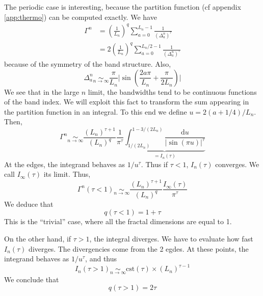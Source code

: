 \documentclass[11pt]{article}
\numberwithin{equation}{section}
\renewcommand{\d}[1]{\mathrm{d}#1}
\newcommand{\simlim}[2]{\ensuremath{ \underset{#1 \rightarrow #2}{\sim} }}
\begin{document}
The periodic case is interesting, because the partition function (cf appendix \ref{app:thermo}) can be computed exactly.
We have
\begin{align}
	\Gamma^n &= \left(\frac{1}{L_n}\right)^q\sum_{a=0}^{L_n -1} \frac{1}{(\Delta_a^n)^\tau} \\
	&= 2\left(\frac{1}{L_n}\right)^q\sum_{a=0}^{L_n/2 -1} \frac{1}{(\Delta_a^n)^\tau}
\end{align}
because of the symmetry of the band structure.
Also,
\begin{equation}
	\Delta_a^n \simlim{n}{\infty} \frac{\pi}{L_n} \bigg| \sin \left( \frac{2 a \pi}{L_n} + \frac{\pi}{2 L_n} \right) \bigg|
\end{equation}
We see that in the large $n$ limit, the bandwidths tend to be continuous functions of the band index. We will exploit this fact to transform the sum appearing in the partition function in an integral.
To this end we define $u = 2(a+1/4)/L_n$.
Then, 
\begin{equation}
	\Gamma^n \simlim{n}{\infty} \frac{(L_n)^{\tau + 1}}{(L_n)^q} \frac{1}{\pi^\tau} \underbrace{\int_{1/(2L_n)}^{1 - 3/(2L_n)} \frac{\d{u}}{|\sin(\pi u)|^\tau}}_{ = I_n(\tau)}
\end{equation}
At the edges, the integrand behaves as $1/u^\tau$. Thus if $\tau < 1$, $I_n(\tau)$ converges. We call $I_\infty(\tau)$ its limit.
Thus,
\begin{equation}
	\Gamma^n(\tau <1) \simlim{n}{\infty} \frac{(L_n)^{\tau + 1}}{(L_n)^q} \frac{I_\infty(\tau)}{\pi^\tau}
\end{equation}
We deduce that
\begin{equation}
\boxed{
	q(\tau < 1) = 1+ \tau
	}
\end{equation}
This is the ``trivial'' case, where all the fractal dimensions are equal to 1.

On the other hand, if $\tau > 1$, the integral diverges. We have to evaluate how fast $I_n(\tau)$ diverges. 
The divergencies come from the 2 egdes. At these points, the integrand behaves as $1/u^\tau$, and thus
\begin{equation}
	I_n(\tau > 1) \simlim{n}{\infty} \text{cst}(\tau) \times (L_n)^{\tau -1}
\end{equation}
We conclude that
\begin{equation}
\boxed{
	q(\tau > 1) = 2 \tau
}
\end{equation}

\newpage
\end{document}
